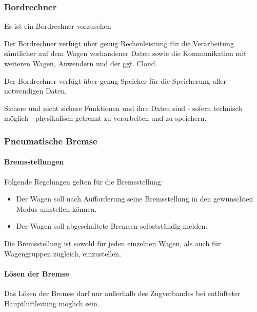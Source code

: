 \subsubsection{Bordrechner}
\begin{feat}
Es ist ein Bordrechner vorzusehen
\end{feat}
\begin{feat}
Der Bordrechner verfügt über genug Rechenleistung für die Verarbeitung sämtlicher auf dem Wagen vorhandener Daten sowie die Kommunikation mit weiteren Wagen, Anwendern und der ggf. Cloud.
\end{feat}
\begin{feat}
Der Bordrechner verfügt über genug Speicher für die Speicherung aller notwendigen Daten.
\end{feat}
\begin{feat}
Sichere und nicht sichere Funktionen und ihre Daten sind - sofern technisch möglich - physikalisch getrennt zu verarbeiten und zu speichern.
\end{feat}

\subsubsection{Pneumatische Bremse}
\paragraph{Bremsstellungen}
\begin{feat}
Folgende Regelungen gelten für die Bremsstellung:
\begin{itemize}
    \item Der Wagen soll nach Aufforderung seine Bremsstellung in den gewünschten Modus umstellen können.
    \item Der Wagen soll abgeschaltete Bremsen selbstständig melden.
\end{itemize}
\end{feat}
\begin{rem} [zu Anf. 46]
Die Bremsstellung ist sowohl für jeden einzelnen Wagen, als auch für Wagengruppen zugleich, einzustellen.
\end{rem}

\paragraph{Lösen der Bremse}
\begin{feat}
Das Lösen der Bremse darf nur außerhalb des \gls{Zugverband}es bei entlüfteter Hauptluftleitung möglich sein.
\end{feat}

